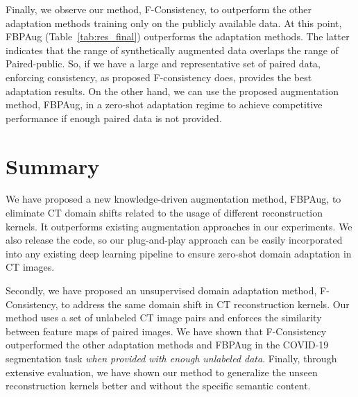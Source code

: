 Finally, we observe our method, F-Consistency, to outperform the other adaptation methods training only on the publicly available data. At this point, FBPAug (Table~\ref{tab:res_final}) outperforms the adaptation methods. The latter indicates that the range of synthetically augmented data overlaps the range of Paired-public. So, if we have a large and representative set of paired data, enforcing consistency, as proposed F-consistency does, provides the best adaptation results. On the other hand, we can use the proposed augmentation method, FBPAug, in a zero-shot adaptation regime to achieve competitive performance if enough paired data is not provided.


\section{Summary}

We have proposed a new knowledge-driven augmentation method, FBPAug, to eliminate CT domain shifts related to the usage of different reconstruction kernels. It outperforms existing augmentation approaches in our experiments. We also release the code, so our plug-and-play approach can be easily incorporated into any existing deep learning pipeline to ensure zero-shot domain adaptation in CT images.

Secondly, we have proposed an unsupervised domain adaptation method, F-Consistency, to address the same domain shift in CT reconstruction kernels. Our method uses a set of unlabeled CT image pairs and enforces the similarity between feature maps of paired images. We have shown that F-Consistency outperformed the other adaptation methods and FBPAug in the COVID-19 segmentation task \textit{when provided with enough unlabeled data}. Finally, through extensive evaluation, we have shown our method to generalize the unseen reconstruction kernels better and without the specific semantic content.


